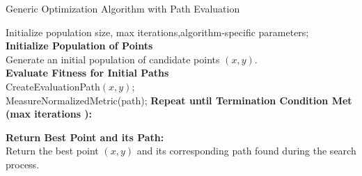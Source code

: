 \begin{algorithm}[H]
    \caption{Generic Optimization Algorithm with Path Evaluation}\label{optimization}
    
    
    Initialize  
    population size, max iterations,algorithm-specific parameters;\\
    \textbf{Initialize Population of Points}\\
    Generate an initial population of candidate points $(x, y)$.\\

    \textbf{Evaluate Fitness for Initial Paths}\\
    CreateEvaluationPath$(x, y)$;\\
    MeasureNormalizedMetric(path);    
    \textbf{Repeat until Termination Condition Met (max iterations ):}\\
    
    \textbf{Return Best Point and its Path:}\\
    Return the best point $(x, y)$ and its corresponding path found during the search process.
    \end{algorithm}

    

    